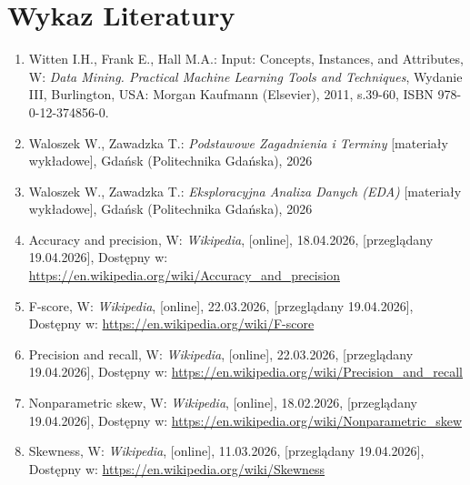 \documentclass[12pt, a4paper]{report}
\begin{document}
\section*{Wykaz Literatury}
\renewcommand{\labelenumi}{[\arabic{enumi}]}
\begin{enumerate}

\item Witten I.H., Frank E., Hall M.A.: Input: Concepts, Instances, and Attributes, W: \textit{Data Mining. Practical Machine Learning Tools and Techniques}, Wydanie III, Burlington, USA: Morgan Kaufmann (Elsevier), 2011, s.39-60, ISBN 978-0-12-374856-0.

\item Waloszek W., Zawadzka T.: \textit{Podstawowe Zagadnienia i Terminy} [materiały wykładowe], Gdańsk (Politechnika Gdańska), 2026
\item Waloszek W., Zawadzka T.: \textit{Eksploracyjna Analiza Danych (EDA)} [materiały wykładowe], Gdańsk (Politechnika Gdańska), 2026

\item  Accuracy and precision, W: \textit{Wikipedia}, [online], 18.04.2026, [przeglądany 19.04.2026], Dostępny w: \url{https://en.wikipedia.org/wiki/Accuracy_and_precision}

\item  F-score, W: \textit{Wikipedia}, [online], 22.03.2026, [przeglądany 19.04.2026], Dostępny w: \url{https://en.wikipedia.org/wiki/F-score}

\item  Precision and recall, W: \textit{Wikipedia}, [online], 22.03.2026, [przeglądany 19.04.2026], Dostępny w: \url{https://en.wikipedia.org/wiki/Precision_and_recall}

\item  Nonparametric skew, W: \textit{Wikipedia}, [online], 18.02.2026, [przeglądany 19.04.2026], Dostępny w: \url{https://en.wikipedia.org/wiki/Nonparametric_skew}

\item  Skewness, W: \textit{Wikipedia}, [online], 11.03.2026, [przeglądany 19.04.2026], Dostępny w: \url{https://en.wikipedia.org/wiki/Skewness}


\end{enumerate}
\end{document}
